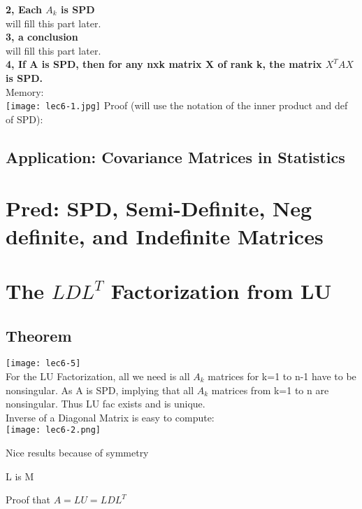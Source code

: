 \documentclass{article}
\begin{document}
\noindent
\textbf{2, Each $A_k$ is SPD}\\
will fill this part later.\\

\noindent
\textbf{3, a conclusion}\\
will fill this part later.\\


\noindent
\textbf{4, If A is SPD, then for any nxk matrix X of rank k, the matrix $X^TAX$ is SPD.}\\
Memory:\\
\texttt{[image: lec6-1.jpg]}
Proof (will use the notation of the inner product and def of SPD):\\




\subsection*{Application: Covariance Matrices in Statistics}

\pagebreak
\section{Pred: SPD, Semi-Definite, Neg definite, and Indefinite Matrices}


\pagebreak
\section{The $LDL^T$ Factorization from LU}
\subsection*{Theorem}
\texttt{[image: lec6-5]}\\

\noindent
For the LU Factorization, all we need is all $A_k$ matrices for k=1 to n-1 have to
be nonsingular. As A is SPD, implying that all $A_k$ matrices from k=1 to n are nonsingular.
Thus LU fac exists and is unique.\\

\noindent
Inverse of a Diagonal Matrix is easy to compute:\\
\texttt{[image: lec6-2.png]}

\noindent
Nice results because of symmetry

L is M

\noindent
Proof that $A = LU = LDL^T$\\
\end{document}

